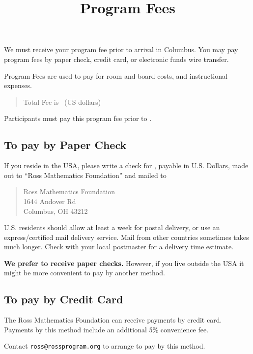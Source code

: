 \documentclass[11pt]{ross}
\title{Program Fees}
\begin{document}
\maketitle

We must receive your program fee prior to arrival in Columbus.  You
may pay program fees by paper check, credit card, or electronic funds
wire transfer.

Program Fees are used to pay for room and board costs, and instructional expenses.
\begin{quote}
Total Fee is \totalfee \ (US dollars)
\end{quote}  

Participants must pay this program fee prior to \feeduedate.

\subsection*{To pay by Paper Check}

If you reside in the USA, please write a check for \totalfee, payable
in U.S. Dollars, made out to ``Ross Mathematics Foundation'' and
mailed to
\begin{quote}
Ross Mathematics Foundation  \\
1644 Andover Rd \\
Columbus, OH 43212
\end{quote}
U.S. residents should allow at least a week for postal delivery, or
use an express/certified mail delivery service. Mail from other
countries sometimes takes much longer.  Check with your local
postmaster for a delivery time estimate.

\textbf{We prefer to receive paper checks.} However, if you live
outside the USA
it might be more convenient to pay by another method.

\subsection*{To pay by Credit Card}


The Ross Mathematics Foundation can receive payments by credit card.
Payments by this method include an additional 5\% convenience fee.

Contact \texttt{ross@rossprogram.org} to arrange to pay by this
method.
\end{document}
